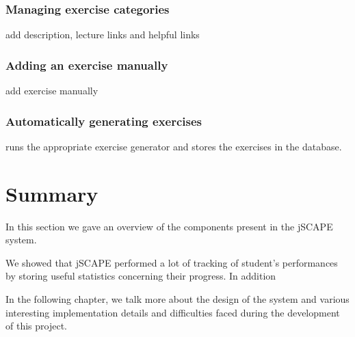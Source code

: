 \subsubsection{Managing exercise categories}
add description, lecture links and helpful links

\subsubsection{Adding an exercise manually}
add exercise manually

\subsubsection{Automatically generating exercises}
runs the appropriate exercise generator and stores the exercises in the database.


\section{Summary}
In this section we gave an overview of the components present in the jSCAPE system. 

We showed that jSCAPE performed a lot of tracking of student's performances by storing useful statistics concerning their progress. In addition\newline

In the following chapter, we talk more about the design of the system and various interesting implementation details and difficulties faced during the development of this project.

